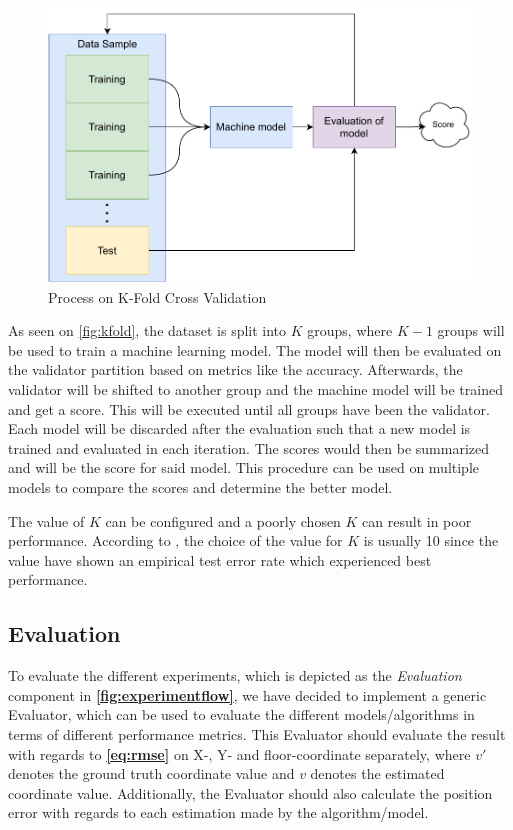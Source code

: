 \begin{figure}[h]
    \centering
    \includegraphics[scale = 0.7]{Images/Experiments/k-fold.pdf}
    \caption{Process on K-Fold Cross Validation}
    \label{fig:kfold}
\end{figure}

As seen on \autoref{fig:kfold}, the dataset is split into $K$ groups, where $K-1$ groups will be used to train a machine learning model. The model will then be evaluated on the validator partition based on metrics like the accuracy. Afterwards, the validator will be shifted to another group and the machine model will be trained and get a score. This will be executed until all groups have been the validator. Each model will be discarded after the evaluation such that a new model is trained and evaluated in each iteration. The scores would then be summarized and will be the score for said model.  
This procedure can be used on multiple models to compare the scores and determine the better model.

The value of $K$ can be configured and a poorly chosen $K$ can result in poor performance. According to \cite{kfold_configk}, the choice of the value for $K$ is usually 10 since the value have shown an empirical test error rate which experienced best performance.    

\subsection{Evaluation}
To evaluate the different experiments, which is depicted as the \textit{Evaluation} component in \textbf{\autoref{fig:experimentflow}}, we have decided to implement a generic Evaluator, which can be used to evaluate the different models/algorithms in terms of different performance metrics.
This Evaluator should evaluate the result with regards to \textbf{\autoref{eq:rmse}} on X-, Y- and floor-coordinate separately, where $v'$ denotes the ground truth coordinate value and $v$ denotes the estimated coordinate value. Additionally, the Evaluator should also calculate the position error with regards to each estimation made by the algorithm/model.

